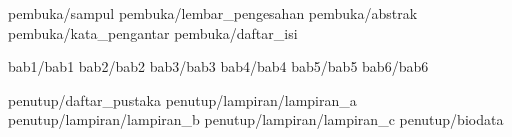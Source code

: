 \documentclass[a5paper, twoside, 11pt, listof=nochaptergap] {book}
\begin{document}
	
	\pagestyle {normal}
	
	\frontmatter
	 {pembuka/sampul}
	 {pembuka/lembar_pengesahan}
	 {pembuka/abstrak}
	 {pembuka/kata_pengantar}
	 {pembuka/daftar_isi}
	
	\mainmatter
	 {bab1/bab1} \cleardoublepage
	 {bab2/bab2} \cleardoublepage
	 {bab3/bab3} \cleardoublepage
	 {bab4/bab4} \cleardoublepage
	 {bab5/bab5} \cleardoublepage
	 {bab6/bab6} \cleardoublepage
	
	\backmatter
	 {penutup/daftar_pustaka}
	 {penutup/lampiran/lampiran_a}
	 {penutup/lampiran/lampiran_b}
	 {penutup/lampiran/lampiran_c}
	 {penutup/biodata}
\end{document}
